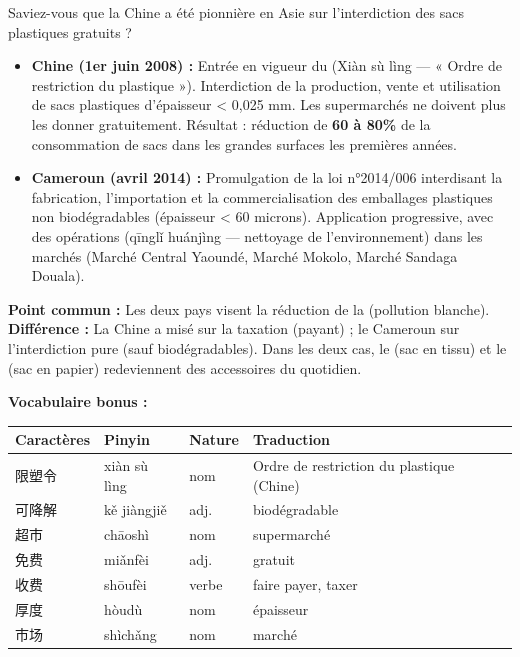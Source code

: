 \documentclass[11pt]{article}
\newcommand{\zh}[1]{\ifmmode\text{#1}\else{#1}\fi}
\begin{document}
\begin{savaistu}
Saviez-vous que la Chine a été pionnière en Asie sur l'interdiction des sacs plastiques gratuits ?
\begin{itemize}
    \item \textbf{Chine (1er juin 2008) :} Entrée en vigueur du \zh{限塑令} (Xiàn sù lìng — « Ordre de restriction du plastique »). Interdiction de la production, vente et utilisation de sacs plastiques d'épaisseur < 0,025 mm. Les supermarchés ne doivent plus les donner gratuitement. Résultat : réduction de \textbf{60 à 80\%} de la consommation de sacs dans les grandes surfaces les premières années.
    \item \textbf{Cameroun (avril 2014) :} Promulgation de la loi n°2014/006 interdisant la fabrication, l'importation et la commercialisation des emballages plastiques non biodégradables (épaisseur < 60 microns). Application progressive, avec des opérations \zh{清理环境} (qīnglǐ huánjìng — nettoyage de l'environnement) dans les marchés (Marché Central Yaoundé, Marché Mokolo, Marché Sandaga Douala).
\end{itemize}
\textbf{Point commun :} Les deux pays visent la réduction de la \zh{白色污染} (pollution blanche). \textbf{Différence :} La Chine a misé sur la taxation (payant) ; le Cameroun sur l'interdiction pure (sauf biodégradables). Dans les deux cas, le \zh{布袋} (sac en tissu) et le \zh{纸袋} (sac en papier) redeviennent des accessoires du quotidien.

\textbf{Vocabulaire bonus :}
\begin{center}
\begin{tabularx}{\linewidth}{|X|X|X|X|}
\hline
\rowcolor{popblueL} \textbf{Caractères} & \textbf{Pinyin} & \textbf{Nature} & \textbf{Traduction} \\
\hline
限塑令 & xiàn sù lìng & nom & Ordre de restriction du plastique (Chine) \\
\hline
可降解 & kě jiàngjiě & adj. & biodégradable \\
\hline
超市 & chāoshì & nom & supermarché \\
\hline
免费 & miǎnfèi & adj. & gratuit \\
\hline
收费 & shōufèi & verbe & faire payer, taxer \\
\hline
厚度 & hòudù & nom & épaisseur \\
\hline
市场 & shìchǎng & nom & marché \\
\hline
\end{tabularx}
\end{center}
\end{savaistu}
\end{document}
